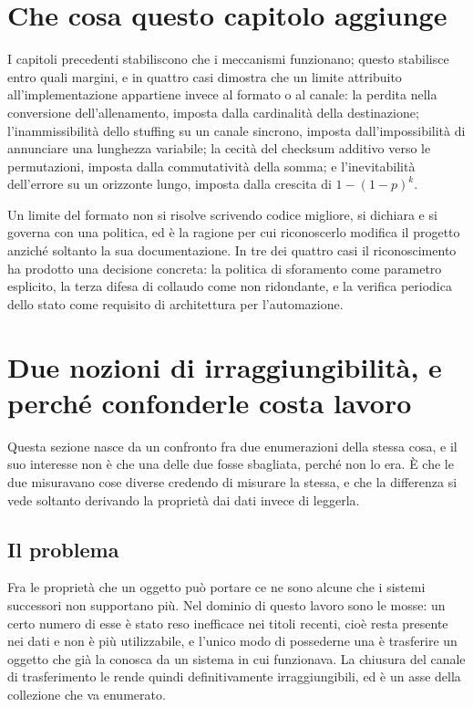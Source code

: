 \section{Che cosa questo capitolo aggiunge}

I capitoli precedenti stabiliscono che i meccanismi funzionano; questo stabilisce entro quali margini, e in quattro casi dimostra che un limite attribuito all'implementazione appartiene invece al formato o al canale: la perdita nella conversione dell'allenamento, imposta dalla cardinalità della destinazione; l'inammissibilità dello stuffing su un canale sincrono, imposta dall'impossibilità di annunciare una lunghezza variabile; la cecità del checksum additivo verso le permutazioni, imposta dalla commutatività della somma; e l'inevitabilità dell'errore su un orizzonte lungo, imposta dalla crescita di $1-(1-p)^k$.

Un limite del formato non si risolve scrivendo codice migliore, si dichiara e si governa con una politica, ed è la ragione per cui riconoscerlo modifica il progetto anziché soltanto la sua documentazione. In tre dei quattro casi il riconoscimento ha prodotto una decisione concreta: la politica di sforamento come parametro esplicito, la terza difesa di collaudo come non ridondante, e la verifica periodica dello stato come requisito di architettura per l'automazione.

\section{Due nozioni di irraggiungibilità, e perché confonderle costa lavoro}
\label{sec:due-irraggiungibilita}

Questa sezione nasce da un confronto fra due enumerazioni della stessa cosa, e il suo interesse non è che una delle due fosse sbagliata, perché non lo era. È che le due misuravano cose diverse credendo di misurare la stessa, e che la differenza si vede soltanto derivando la proprietà dai dati invece di leggerla.

\subsection{Il problema}

Fra le proprietà che un oggetto può portare ce ne sono alcune che i sistemi successori non supportano più. Nel dominio di questo lavoro sono le mosse: un certo numero di esse è stato reso inefficace nei titoli recenti, cioè resta presente nei dati e non è più utilizzabile, e l'unico modo di possederne una è trasferire un oggetto che già la conosca da un sistema in cui funzionava. La chiusura del canale di trasferimento le rende quindi definitivamente irraggiungibili, ed è un asse della collezione che va enumerato.

